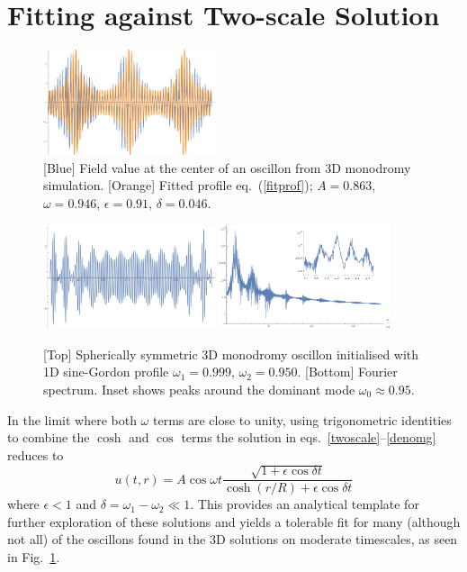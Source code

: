\documentclass{report}
\begin{document}
\section{Fitting against Two-scale Solution}
\begin{figure}
  \centering
  \includegraphics[width=0.45\textwidth]{plot/simul-profile.png}
  \caption{[Blue] Field value at the center of an oscillon from 3D monodromy simulation. [Orange] Fitted profile eq.~(\ref{fitprof}); $A=0.863$, $\omega=0.946$, $\epsilon=0.91$,  $\delta=0.046$.}\label{simul-prof}
\end{figure}

\begin{figure}
  \centering
  \includegraphics[width=0.45\textwidth]{plot/profile-3scale.png}
  \includegraphics[width=0.45\textwidth]{plot/fourier.png}
  \caption{[Top] Spherically symmetric 3D monodromy oscillon initialised with 1D
    sine-Gordon profile $\omega_1=0.999$, $\omega_2=0.950$.  [Bottom] Fourier spectrum. Inset shows  peaks around the dominant mode $\omega_0\approx0.95$.}\label{fourier}
\end{figure}

In the limit where  both $\omega$ terms are  close to unity, using trigonometric identities to combine the $\cosh$ and $\cos$ terms the solution in eqs.~\ref{twoscale}--\ref{denomg} reduces to
%
\begin{equation} \label{fitprof}
  u(t,r) = A\cos\omega t \frac{\sqrt{1+\epsilon \cos \delta t}}{\cosh(r/R) + \epsilon \cos \delta t}
\end{equation}
where $\epsilon<1$ and $\delta = \omega_1-\omega_2 \ll 1$. This provides an analytical template for further exploration of these solutions and yields a tolerable fit for many (although not all) of the oscillons found in the 3D solutions on moderate timescales, as seen in Fig.~\ref{simul-prof}. 
\end{document}
